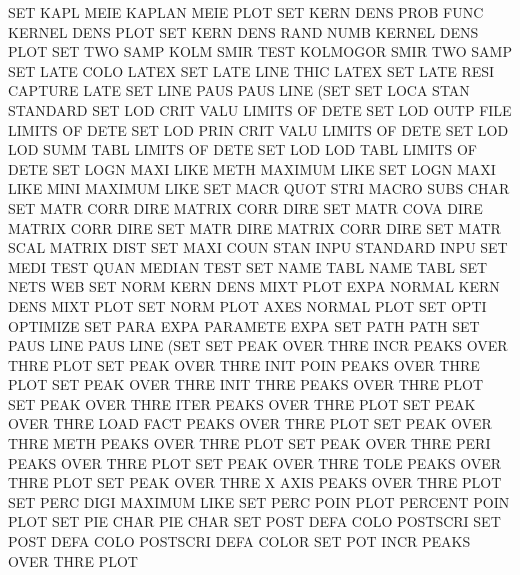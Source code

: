 SET      KAPL MEIE                      KAPLAN   MEIE PLOT
SET      KERN DENS PROB FUNC            KERNEL   DENS PLOT
SET      KERN DENS RAND NUMB            KERNEL   DENS PLOT
SET      TWO  SAMP KOLM SMIR TEST       KOLMOGOR SMIR TWO  SAMP
SET      LATE COLO                      LATEX
SET      LATE LINE THIC                 LATEX
SET      LATE RESI                      CAPTURE  LATE
SET      LINE PAUS                      PAUS     LINE (SET
SET      LOCA STAN                      STANDARD
SET      LOD      CRIT VALU             LIMITS   OF   DETE
SET      LOD      OUTP FILE             LIMITS   OF   DETE
SET      LOD      PRIN CRIT VALU        LIMITS   OF   DETE
SET      LOD      LOD  SUMM TABL        LIMITS   OF   DETE
SET      LOD      LOD  TABL             LIMITS   OF   DETE
SET      LOGN MAXI LIKE METH            MAXIMUM  LIKE
SET      LOGN MAXI LIKE MINI            MAXIMUM  LIKE
SET      MACR QUOT STRI                 MACRO    SUBS CHAR
SET      MATR CORR DIRE                 MATRIX   CORR DIRE
SET      MATR COVA DIRE                 MATRIX   CORR DIRE
SET      MATR DIRE                      MATRIX   CORR DIRE
SET      MATR SCAL                      MATRIX   DIST
SET      MAXI COUN STAN INPU            STANDARD INPU
SET      MEDI TEST QUAN                 MEDIAN   TEST
SET      NAME TABL                      NAME     TABL
SET      NETS                           WEB
SET      NORM KERN DENS MIXT PLOT EXPA  NORMAL   KERN DENS MIXT PLOT
SET      NORM PLOT AXES                 NORMAL   PLOT
SET      OPTI                           OPTIMIZE
SET      PARA EXPA                      PARAMETE EXPA
SET      PATH                           PATH
SET      PAUS LINE                      PAUS     LINE (SET
SET      PEAK OVER THRE INCR            PEAKS    OVER THRE PLOT
SET      PEAK OVER THRE INIT POIN       PEAKS    OVER THRE PLOT
SET      PEAK OVER THRE INIT THRE       PEAKS    OVER THRE PLOT
SET      PEAK OVER THRE ITER            PEAKS    OVER THRE PLOT
SET      PEAK OVER THRE LOAD FACT       PEAKS    OVER THRE PLOT
SET      PEAK OVER THRE METH            PEAKS    OVER THRE PLOT
SET      PEAK OVER THRE PERI            PEAKS    OVER THRE PLOT
SET      PEAK OVER THRE TOLE            PEAKS    OVER THRE PLOT
SET      PEAK OVER THRE X    AXIS       PEAKS    OVER THRE PLOT
SET      PERC DIGI                      MAXIMUM  LIKE
SET      PERC POIN PLOT                 PERCENT  POIN PLOT
SET      PIE  CHAR                      PIE      CHAR
SET      POST DEFA COLO                 POSTSCRI
SET      POST DEFA COLO                 POSTSCRI DEFA COLOR
SET      POT  INCR                      PEAKS    OVER THRE PLOT
